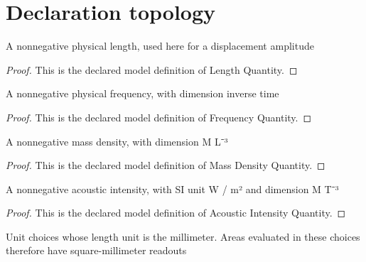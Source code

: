 \section{Declaration topology}
\begin{definition}
  \label{def:physics:phyx-mini-0189:phyxminiproblems-problemphyxmini0189-lengthquantity}
  A nonnegative physical length, used here for a displacement amplitude
\end{definition}
\begin{proof}
  This is the declared model definition of Length Quantity.
\end{proof}
\begin{definition}
  \label{def:physics:phyx-mini-0189:phyxminiproblems-problemphyxmini0189-frequencyquantity}
  A nonnegative physical frequency, with dimension inverse time
\end{definition}
\begin{proof}
  This is the declared model definition of Frequency Quantity.
\end{proof}
\begin{definition}
  \label{def:physics:phyx-mini-0189:phyxminiproblems-problemphyxmini0189-massdensityquantity}
  A nonnegative mass density, with dimension M L⁻³
\end{definition}
\begin{proof}
  This is the declared model definition of Mass Density Quantity.
\end{proof}
\begin{definition}
  \label{def:physics:phyx-mini-0189:phyxminiproblems-problemphyxmini0189-acousticintensityquantity}
  A nonnegative acoustic intensity, with SI unit W / m² and dimension M T⁻³
\end{definition}
\begin{proof}
  This is the declared model definition of Acoustic Intensity Quantity.
\end{proof}
\begin{definition}
  \label{def:physics:phyx-mini-0189:phyxminiproblems-problemphyxmini0189-squaremillimeterunitchoices}
  Unit choices whose length unit is the millimeter. Areas evaluated in these choices therefore have square-millimeter readouts
\end{definition}
